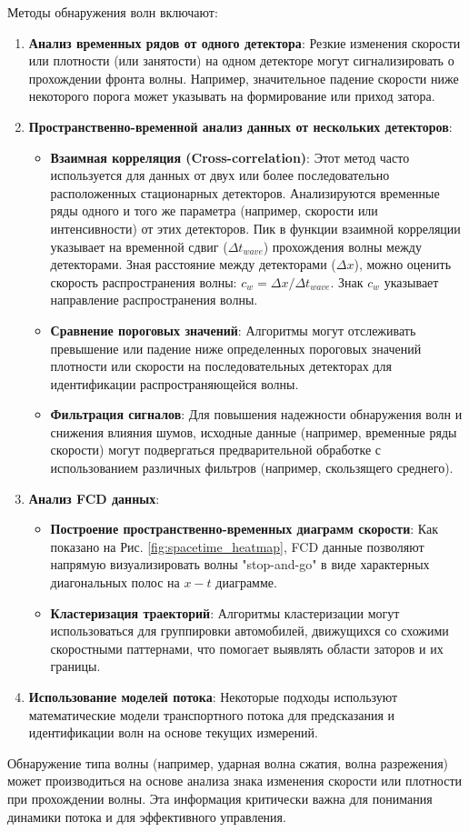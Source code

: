 \documentclass[12pt, a4paper]{article}
\begin{document}
Методы обнаружения волн включают:
\begin{enumerate}
    \item \textbf{Анализ временных рядов от одного детектора}: Резкие изменения скорости или плотности (или занятости) на одном детекторе могут сигнализировать о прохождении фронта волны. Например, значительное падение скорости ниже некоторого порога может указывать на формирование или приход затора.
    \item \textbf{Пространственно-временной анализ данных от нескольких детекторов}:
        \begin{itemize}
            \item \textbf{Взаимная корреляция (Cross-correlation)}: Этот метод часто используется для данных от двух или более последовательно расположенных стационарных детекторов. Анализируются временные ряды одного и того же параметра (например, скорости или интенсивности) от этих детекторов. Пик в функции взаимной корреляции указывает на временной сдвиг ($\Delta t_{wave}$) прохождения волны между детекторами. Зная расстояние между детекторами ($\Delta x$), можно оценить скорость распространения волны: $c_w = \Delta x / \Delta t_{wave}$. Знак $c_w$ указывает направление распространения волны.
            \item \textbf{Сравнение пороговых значений}: Алгоритмы могут отслеживать превышение или падение ниже определенных пороговых значений плотности или скорости на последовательных детекторах для идентификации распространяющейся волны.
            \item \textbf{Фильтрация сигналов}: Для повышения надежности обнаружения волн и снижения влияния шумов, исходные данные (например, временные ряды скорости) могут подвергаться предварительной обработке с использованием различных фильтров (например, скользящего среднего).
        \end{itemize}
    \item \textbf{Анализ FCD данных}:
        \begin{itemize}
            \item \textbf{Построение пространственно-временных диаграмм скорости}: Как показано на Рис. \ref{fig:spacetime_heatmap}, FCD данные позволяют напрямую визуализировать волны "stop-and-go" в виде характерных диагональных полос на $x-t$ диаграмме.
            \item \textbf{Кластеризация траекторий}: Алгоритмы кластеризации могут использоваться для группировки автомобилей, движущихся со схожими скоростными паттернами, что помогает выявлять области заторов и их границы.
        \end{itemize}
    \item \textbf{Использование моделей потока}: Некоторые подходы используют математические модели транспортного потока для предсказания и идентификации волн на основе текущих измерений.
\end{enumerate}
Обнаружение типа волны (например, ударная волна сжатия, волна разрежения) может производиться на основе анализа знака изменения скорости или плотности при прохождении волны. Эта информация критически важна для понимания динамики потока и для эффективного управления.
\end{document}
